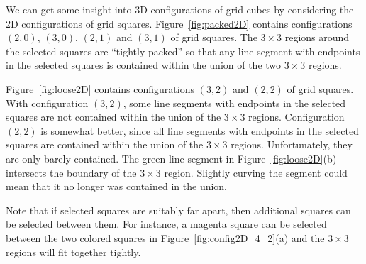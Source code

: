We can get some insight into 3D configurations of grid cubes
by considering the 2D configurations of grid squares.
Figure~\ref{fig:packed2D} contains configurations $(2,0)$, $(3,0)$,
$(2,1)$ and $(3,1)$ of grid squares.
The $3 \times 3$ regions around the selected squares are ``tightly packed''
so that any line segment with endpoints in the selected squares
is contained within the union of the two $3 \times 3$ regions.

Figure~\ref{fig:loose2D} contains configurations $(3,2)$ and $(2,2)$
of grid squares.
With configuration $(3,2)$, some line segments with endpoints
in the selected squares are not contained within the union
of the $3 \times 3$ regions.
Configuration $(2,2)$ is somewhat better,
since all line segments with endpoints in the selected squares
are contained within the union of the $3 \times 3$ regions.
Unfortunately, they are only barely contained.
The green line segment in Figure~\ref{fig:loose2D}(b) intersects
the boundary of the $3 \times 3$ region.
Slightly curving the segment could mean that it no longer was contained
in the union.

Note that if selected squares are suitably far apart,
then additional squares can be selected between them.
For instance, a magenta square can be selected between the two colored squares
in Figure~\ref{fig:config2D_4_2}(a) and the $3 \times 3$ regions
will fit together tightly.

